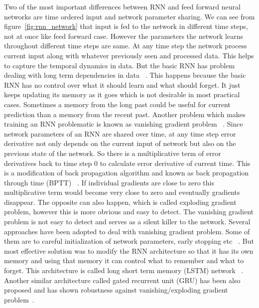 \documentclass[10pt,twocolumn,letterpaper]{article}
\begin{document}
Two of the most important differences between RNN and feed forward neural networks are time ordered input and network parameter sharing. We can see from figure~\ref{fig:rnn_network} that input is fed to the network in different time steps, not at once like feed forward case. However the parameters the network learns throughout different time steps are same. At any time step the network process current input along with whatever previously seen and processed data. This helps to capture the temporal dynamics in data. But the basic RNN has problem dealing with long term dependencies in data ~\cite{DBLP:journals/corr/abs-1211-5063}. This happens because the basic RNN has no control over what it should learn and what should forget. It just keeps updating its memory as it goes which is not desirable in most practical cases. Sometimes a memory from the long past could be useful for current prediction than a memory from the recent past. Another problem which makes training an RNN problematic is known as vanishing gradient problem ~\cite{DBLP:journals/corr/abs-1211-5063}. Since network parameters of an RNN are shared over time, at any time step error derivative not only depends on the current input of network but also on the previous state of the network. So there is a multiplicative term of error derivatives back to time step $0$ to calculate error derivative of current time. This is a modification of back propagation algorithm and known as back propagation through time (BPTT) ~\cite{58337}. If individual gradients are close to zero this multiplicative term would become very close to zero and eventually gradients disappear. The opposite can also happen, which is called exploding gradient problem, however this is more obvious and easy to detect. The vanishing gradient problem is not easy to detect and serves as a silent killer to the network. Several approaches have been adopted to deal with vanishing gradient problem. Some of them are to careful initialization of network parameters, early stopping etc ~\cite{DBLP:journals/corr/abs-1211-5063}. But most effective solution was to modify the RNN architecture so that it has its own memory and using that memory it can control what to remember and what to forget. This architecture is called long short term memory (LSTM) network ~\cite{Hochreiter:1997:LSM:1246443.1246450}. Another similar architecture called gated recurrent unit (GRU) has been also proposed and has shown robustness against vanishing/exploding gradient problem~\cite{DBLP:journals/corr/ChoMGBSB14}.
\end{document}
